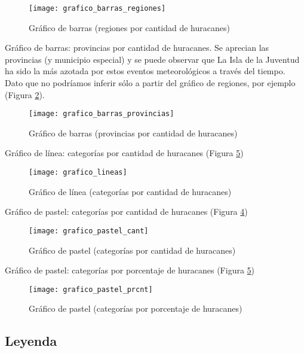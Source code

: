 \begin{figure}[H]
\centering
\texttt{[image: grafico\_barras\_regiones]}
\caption{Gráfico de barras (regiones por cantidad de huracanes)}
\label{fig:grafico_barras_regiones}
\end{figure}

\pagebreak

Gráfico de barras: provincias por cantidad de huracanes. Se aprecian las provincias (y municipio especial) y se puede observar que La Isla de la Juventud ha sido la más azotada por estos eventos meteorológicos a través del tiempo. Dato que no podríamos inferir sólo a partir del gráfico de regiones, por ejemplo (Figura \ref{fig:grafico_barras_provincias}).

\begin{figure}[H]
\centering
\texttt{[image: grafico\_barras\_provincias]}
\caption{Gráfico de barras (provincias por cantidad de huracanes)}
\label{fig:grafico_barras_provincias}
\end{figure}



Gráfico de línea: categorías por cantidad de huracanes (Figura \ref{fig:grafico_pastel_prcnt})

\begin{figure}[H]
\centering
\texttt{[image: grafico\_lineas]}
\caption{Gráfico de línea (categorías por cantidad de huracanes)}
\label{fig:grafico_lineas}
\end{figure}

\pagebreak

Gráfico de pastel: categorías por cantidad de huracanes (Figura \ref{fig:grafico_pastel_cant})

\begin{figure}[H]
\centering
\texttt{[image: grafico\_pastel\_cant]}
\caption{Gráfico de pastel (categorías por cantidad de huracanes)}
\label{fig:grafico_pastel_cant}
\end{figure}

Gráfico de pastel: categorías por porcentaje de huracanes (Figura \ref{fig:grafico_pastel_prcnt})

\begin{figure}[H]
\centering
\texttt{[image: grafico\_pastel\_prcnt]}
\caption{Gráfico de pastel (categorías por porcentaje de huracanes)}
\label{fig:grafico_pastel_prcnt}
\end{figure}

\pagebreak


\subsection{Leyenda}

